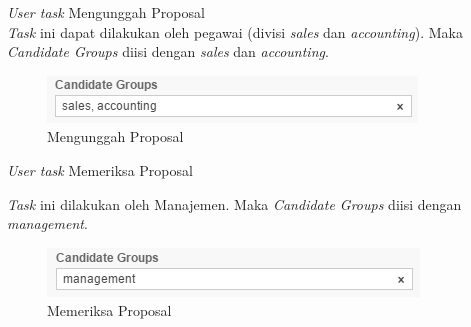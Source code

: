 \begin{description}
	\item \textit{User task} Mengunggah Proposal \\
  \textit{Task} ini dapat dilakukan oleh pegawai (divisi \textit{sales} dan \textit{accounting}). Maka \textit{Candidate Groups} diisi dengan \textit{sales} dan \textit{accounting}.
		\begin{figure}[H]
			\centering
			\includegraphics[scale=1]{Gambar/Bab-3/Kasus1/1group}
			\caption{Mengunggah Proposal} 
			\label{fig:pengajuanproposalmengunggahproposal_group}
	\end{figure}
	
	
	\item \textit{User task} Memeriksa Proposal
	
	\item \textit{Task} ini dilakukan oleh Manajemen. Maka \textit{Candidate Groups} diisi dengan \textit{management}.
		\begin{figure}[H]
			\centering
			\includegraphics[scale=1]{Gambar/Bab-3/Kasus1/3group2}
			\caption{Memeriksa Proposal} 
			\label{fig:pengajuanproposal_memeriksaproposal_group}
	\end{figure}

\end{description}


